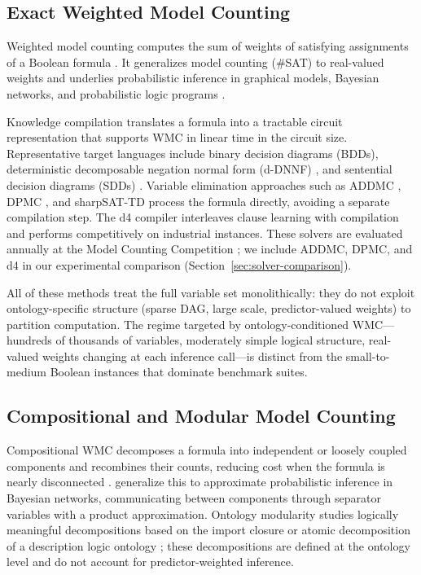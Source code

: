 \documentclass[12pt]{article}
\begin{document}
\subsection{Exact Weighted Model Counting}

Weighted model counting computes the sum of weights of satisfying
assignments of a Boolean formula \citep{chavira2008wmc}. It generalizes
model counting (\#SAT) to real-valued weights and underlies probabilistic
inference in graphical models, Bayesian networks, and probabilistic logic
programs \citep{fierens2015problog,de2007probfoil}.

Knowledge compilation translates a formula into a tractable circuit
representation that supports WMC in linear time in the circuit size.
Representative target languages include binary decision diagrams (BDDs),
deterministic decomposable negation normal form (d-DNNF)
\citep{darwiche2002kcmap}, and sentential decision diagrams (SDDs)
\citep{darwiche2011sdd}. Variable elimination approaches such as ADDMC
\citep{dudek2020addmc}, DPMC \citep{dudek2020dpmc}, and sharpSAT-TD
process the formula directly, avoiding a separate compilation step. The
d4 compiler \citep{lagniez2017improved} interleaves clause learning
with compilation and performs competitively on industrial instances.
These solvers are evaluated annually at the Model Counting Competition
\citep{fichte2021mcc}; we include ADDMC, DPMC, and d4 in our
experimental comparison (Section~\ref{sec:solver-comparison}).

All of these methods treat the full variable set monolithically: they
do not exploit ontology-specific structure (sparse DAG, large scale,
predictor-valued weights) to partition computation. The regime targeted
by ontology-conditioned WMC---hundreds of thousands of variables,
moderately simple logical structure, real-valued weights changing at
each inference call---is distinct from the small-to-medium Boolean
instances that dominate benchmark suites.

\subsection{Compositional and Modular Model Counting}

Compositional WMC decomposes a formula into independent or loosely
coupled components and recombines their counts, reducing cost when the
formula is nearly disconnected \citep{dal2017partitioned,
dal2021compositional}. \citet{dal2021compositional} generalize this to
approximate probabilistic inference in Bayesian networks, communicating
between components through separator variables with a product
approximation. Ontology modularity studies logically meaningful
decompositions based on the import closure or atomic decomposition of a
description logic ontology \citep{cuencagrau2008modular,
delvescovo2011atomic}; these decompositions are defined at the ontology
level and do not account for predictor-weighted inference.
\end{document}
